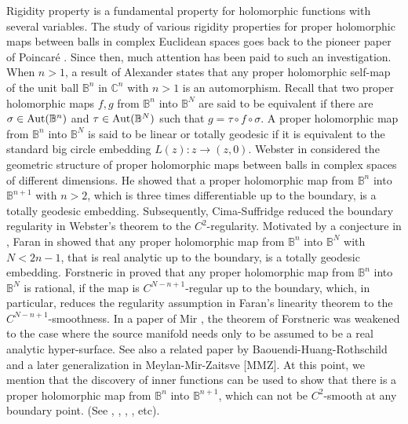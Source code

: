 \documentclass[12pt]{article}
\numberwithin{equation}{section}
\def\ra{\rightarrow}
\def\BB{{\mathbb B}}
\def\CC{{\mathbb C}}
\def\ra{\rightarrow}
\begin{document}
Rigidity property is a fundamental property for holomorphic
functions with several variables. The study of various rigidity
properties for proper holomorphic maps between balls in complex
Euclidean spaces goes back  to the pioneer  paper of Poincar\'e
\cite{Po}. Since
 then,  much attention has been paid to such an investigation.
 When $n>1$,
 a  result of  Alexander \cite{Alx} states that any
 proper holomorphic
self-map of the unit ball ${\BB}^n$ in ${\CC}^{n}$ with $n>1$ is an
automorphism.
 Recall that two proper holomorphic maps $f,g$ from
 ${\BB}^n$ into ${\BB}^{N}$
 are said to be equivalent if there are
$\sigma\in \hbox {Aut}( {\BB}^n)$ and $\tau\in \hbox {Aut}({\BB}^N)$
such that $g=\tau\circ f\circ \sigma$.  A proper holomorphic map from
 ${\BB}^n$ into ${\BB}^{N}$ is said to be linear or totally geodesic if
 it is equivalent to the standard big circle embedding $L(z):z\ra
(z,0)$.
 Webster in \cite{W} considered the
geometric structure of proper holomorphic maps between balls in
 complex spaces of different dimensions.
 He showed that a proper
holomorphic map from ${\BB}^n$ into ${\BB}^{n+1}$ with $n>2$,
 which is three
times differentiable up to the boundary, is a totally geodesic
embedding. Subsequently, Cima-Suffridge \cite{CS1} reduced the boundary
regularity in Webster's theorem  to the $C^2$-regularity. Motivated
by a conjecture  in \cite{CS1},  Faran in \cite{Fa2} showed that any proper
holomorphic map from ${\BB}^n$ into $ {\BB}^{N}$ with $N<2n-1$, that
is real analytic up to the boundary, is  a totally geodesic
embedding. Forstneric in \cite{Fo1} proved that
 any proper holomorphic map from ${\BB}^n$ into ${\BB}^{N}$ is
rational, if the map is $C^{N-n+1}$-regular up to the boundary,
which, in particular, reduces the regularity assumption in Faran's
linearity theorem to the $C^{N-n+1}$-smoothness. In a paper of Mir
\cite{Mir}, the theorem of Forstneric was weakened to the case where the
source manifold needs only to be  assumed to be a real analytic
hyper-surface. See also a related paper by Baouendi-Huang-Rothschild
\cite{BHR} and a later generalization in Meylan-Mir-Zaitsve [MMZ].  At
this point, we mention that the discovery of inner functions can be
used to show that there is a
 proper holomorphic map from ${\BB}^n$ into ${\BB}^{n+1}$, which can not be $C^2$-smooth
 at any boundary point. (See \cite{HS}, \cite{Low}, \cite{Fo2}, \cite{Ste}, etc).
\end{document}
